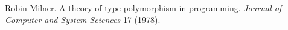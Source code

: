 \begin{thebibliography}{99}
Robin Milner.
A theory of type polymorphism in programming.
\emph{Journal of Computer and System Sciences} 17 (1978).
\end{thebibliography}
